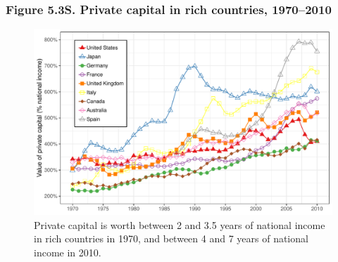 \documentclass[t]{beamer}\usepackage[]{graphicx}\usepackage[]{color}
\newenvironment{knitrout}{}{} %
\begin{document}
\begin{frame}[label=Figure_5_3S]
\frametitle{Figure 5.3S. Private capital in rich countries, 1970--2010}
\begin{figure}[t]
\begin{minipage}[b]{\textwidth}
\centering
\begin{knitrout}\footnotesize
{}\color{fgcolor}

{\centering \includegraphics[width=1\linewidth]{figures/color/Figure_5_3S} 

}



\end{knitrout}
\caption{Private capital is worth between 2 and 3.5 years of national income in rich countries in 1970, and between 4 and 7 years of national income in 2010.}
\end{minipage}
\end{figure}
\end{frame}
\end{document}

